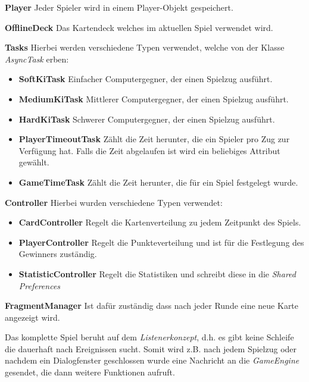 \begin{itemize}
\item{\textbf{Player}\quad 
Jeder Spieler wird in einem Player-Objekt gespeichert.
}
\item{\textbf{OfflineDeck}\quad
Das Kartendeck welches im aktuellen Spiel verwendet wird.
}
\item{\textbf{Tasks}\quad
Hierbei werden verschiedene Typen verwendet, welche von der Klasse \emph{AsyncTask} erben:
	\begin{itemize}
	\item{\textbf{SoftKiTask}\quad
	Einfacher Computergegner, der einen Spielzug ausführt.
	}
	\item{\textbf{MediumKiTask}\quad
	Mittlerer Computergegner, der einen Spielzug ausführt.	
	}
	\item{\textbf{HardKiTask}\quad
	Schwerer Computergegner, der einen Spielzug ausführt.
	}
	\item{\textbf{PlayerTimeoutTask}\quad
	Zählt die Zeit herunter, die ein Spieler pro Zug zur Verfügung hat. Falls die Zeit abgelaufen ist wird ein beliebiges Attribut gewählt.
	}
	\item{\textbf{GameTimeTask}\quad
	Zählt die Zeit herunter, die für ein Spiel festgelegt wurde.
	}
	\end{itemize}
\item{\textbf{Controller}\quad
Hierbei wurden verschiedene Typen verwendet:
	\begin{itemize}
	\item{\textbf{CardController}\quad
	Regelt die Kartenverteilung zu jedem Zeitpunkt des Spiels. 
	}
	\item{\textbf{PlayerController}\quad
	Regelt die Punkteverteilung und ist für die Festlegung des Gewinners zuständig.
	}
	\item{\textbf{StatisticController}\quad
	Regelt die Statistiken und schreibt diese in die \emph{Shared Preferences}
	}
	\end{itemize}
}
\item{\textbf{FragmentManager}\quad
Ist dafür zuständig dass nach jeder Runde eine neue Karte angezeigt wird.
}
}
\end{itemize}

Das komplette Spiel beruht auf dem \emph{Listenerkonzept}, d.h. es gibt keine Schleife die dauerhaft nach Ereignissen sucht. Somit wird z.B. nach jedem Spielzug oder nachdem ein Dialogfenster geschlossen wurde eine Nachricht an die \emph{GameEngine} gesendet, die dann weitere Funktionen aufruft.


